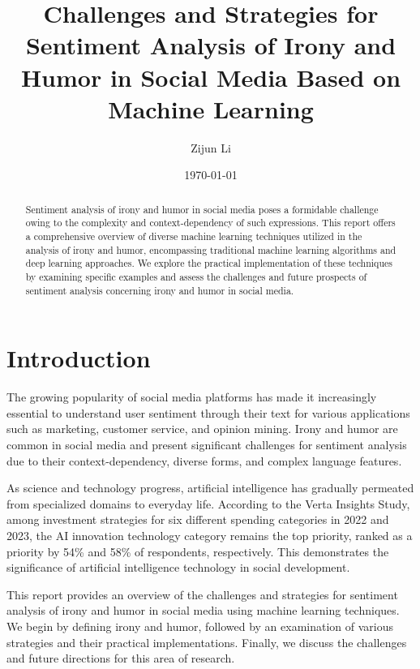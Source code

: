 \documentclass[a4paper]{article}
\title{\textbf{Challenges and Strategies for Sentiment Analysis of Irony and Humor in Social Media Based on Machine Learning}}
\author{Zijun Li}
\date{\today}
\begin{document}
\setlength{\parindent}{2em}

\maketitle
\thispagestyle{empty}

\begin{abstract}
    Sentiment analysis of irony and humor in social media poses a formidable challenge owing to the complexity and context-dependency of such expressions. This report offers a comprehensive overview of diverse machine learning techniques utilized in the analysis of irony and humor, encompassing traditional machine learning algorithms and deep learning approaches. We explore the practical implementation of these techniques by examining specific examples and assess the challenges and future prospects of sentiment analysis concerning irony and humor in social media.
\end{abstract}


\newpage
\setcounter{page}{1}
\section{Introduction}

The growing popularity of social media platforms has made it increasingly essential to understand user sentiment through their text for various applications such as marketing, customer service, and opinion mining. Irony and humor are common in social media and present significant challenges for sentiment analysis due to their context-dependency, diverse forms, and complex language features.

As science and technology progress, artificial intelligence has gradually permeated from specialized domains to everyday life. According to the Verta Insights Study, among investment strategies for six different spending categories in 2022 and 2023, the AI innovation technology category remains the top priority, ranked as a priority by 54\% and 58\% of respondents, respectively. This demonstrates the significance of artificial intelligence technology in social development.

This report provides an overview of the challenges and strategies for sentiment analysis of irony and humor in social media using machine learning techniques. We begin by defining irony and humor, followed by an examination of various strategies and their practical implementations. Finally, we discuss the challenges and future directions for this area of research.
\end{document}
